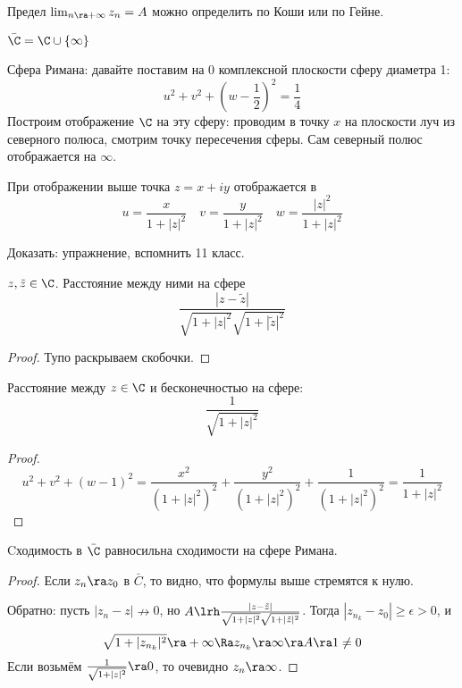 \begin{Def}
	Предел $\lim_{n \ra +\infty} z_n = A$ можно определить по Коши или по Гейне.
\end{Def}

\begin{Rem}
	$\bar \C = \C \cup \{\infty\}$
\end{Rem}

Сфера Римана: давайте поставим на 0 комплексной плоскости сферу диаметра 1:
\[ u^2 + v^2 + \left(w - \frac12\right)^2 = \frac14 \]
Построим отображение $\C$ на эту сферу: проводим в точку $x$ на плоскости луч из северного полюса, смотрим точку пересечения сферы.
Сам северный полюс отображается на $\infty$.

\begin{theorem}
	При отображении выше точка $z = x + iy$ отображается в
	\[ u = \frac x{1+|z|^2} \quad v = \frac y{1+|z|^2} \quad w = \frac{|z|^2}{1 + |z|^2} \]
\end{theorem}
Доказать: упражнение, вспомнить 11 класс.

\begin{conseq}
	$z, \tilde z \in \C$.
	Расстояние между ними на сфере
	\[ \frac{|z - \tilde z|}{\sqrt{1+|z|^2}\sqrt{1+|\tilde z|^2}} \]
\end{conseq}
\begin{proof}
	Тупо раскрываем скобочки.
\end{proof}

\begin{conseq}
	Расстояние между $z \in \C$ и бесконечностью на сфере:
	\[ \frac1{\sqrt{1+|z|^2}} \]
\end{conseq}
\begin{proof}
	\[
		u^2 + v^2 + (w-1)^2
		= \frac{x^2}{(1+|z|^2)^2} + \frac{y^2}{(1+|z|^2)^2} + \frac1{(1+|z|^2)^2}
		= \frac1{1+|z|^2}
	\]
\end{proof}

\begin{conseq}
	Cходимость в $\bar \C$ равносильна сходимости на сфере Римана.
\end{conseq}
\begin{proof}
	Если $z_n \ra z_0$ в $\bar C$, то видно, что формулы выше стремятся к нулю.

	Обратно: пусть $|z_n - z| \nrightarrow 0$, но $A \lrh \frac{|z - \tilde z|}{\sqrt{1+|z|^2}\sqrt{1+|\tilde z|^2}}$.
	Тогда $|z_{n_k} - z_0| \ge \epsilon > 0$, и
	\[ \sqrt{1+|z_{n_k}|^2} \ra +\infty \Ra z_{n_k} \ra \infty \ra A \ra 1 \ne 0\]
	Если возьмём $\frac1{\sqrt{1+|z|^2}} \ra 0$, то очевидно $z_n \ra \infty$.
\end{proof}

